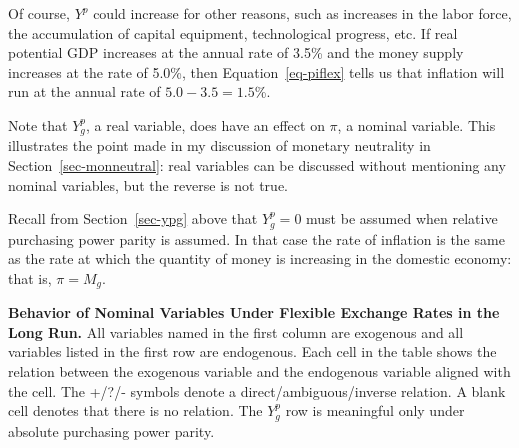 \documentclass[
  letterpaper,
]{book}
\theoremstyle{plain}
\theoremstyle{remark}
\begin{document}
Of course, \(Y^p\) could increase for other reasons, such as increases
in the labor force, the accumulation of capital equipment, technological
progress, etc. If real potential GDP increases at the annual rate of
3.5\% and the money supply increases at the rate of 5.0\%, then
Equation~\ref{eq-piflex} tells us that inflation will run at the annual
rate of \(5.0-3.5=1.5\)\%.

Note that \(Y^p_g\), a real variable, does have an effect on \(\pi\), a
nominal variable. This illustrates the point made in my discussion of
monetary neutrality in Section~\ref{sec-monneutral}: real variables can
be discussed without mentioning any nominal variables, but the reverse
is not true.

Recall from Section~\ref{sec-ypg} above that \(Y^p_g=0\) must be assumed
when relative purchasing power parity is assumed. In that case the rate
of inflation is the same as the rate at which the quantity of money is
increasing in the domestic economy: that is, \(\pi=M_g\).

\begin{table}

\caption{\label{tbl-nominal_long_flex}\textbf{Behavior of Nominal
Variables Under Flexible Exchange Rates in the Long Run.} All variables
named in the first column are exogenous and all variables listed in the
first row are endogenous. Each cell in the table shows the relation
between the exogenous variable and the endogenous variable aligned with
the cell. The +/?/- symbols denote a direct/ambiguous/inverse relation.
A blank cell denotes that there is no relation. The \(Y^p_g\) row is
meaningful only under absolute purchasing power parity.}


\end{table}%
\end{document}
